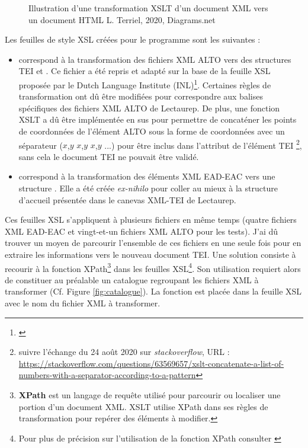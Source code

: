 \begin{figure}[h!]
    \centering
    \centerline{}
    \caption{Illustration d'une transformation XSLT d'un document XML vers un document HTML  \textcopyright L. Terriel, 2020, Diagrams.net}
    \label{fig:example_XSLT}
\end{figure}
\newpage
Les feuilles de style XSL créées pour le programme sont les suivantes : 
\begin{itemize}
    \item {} correspond à la transformation des fichiers XML ALTO vers des structures TEI  et . Ce fichier a été repris et adapté sur la base de la feuille XSL proposée par le Dutch Language Institute (INL)\footnote{\cite{dutch_language_institute_inl_alto2tei_nodate}}. Certaines règles de transformation ont dû être modifiées pour correspondre aux balises spécifiques des fichiers XML ALTO de Lectaurep. De plus, une fonction XSLT a dû être implémentée en sus pour permettre de concaténer les points de coordonnées de l'élément ALTO  sous la forme de coordonnées avec un séparateur ($x$,$y$ $x$,$y$ $x$,$y$ ...)  pour être inclus dans l'attribut  de l'élément TEI \footnote{suivre l'échange du 24 août 2020 sur \textit{stackoverflow}, URL : \url{https://stackoverflow.com/questions/63569657/xslt-concatenate-a-list-of-numbers-with-a-separator-according-to-a-pattern}}, sans cela le document TEI ne pouvait être validé.\\ 
    \item {} correspond à la transformation des éléments XML EAD-EAC vers une structure . Elle a été créée \textit{ex-nihilo} pour coller au mieux à la structure d'accueil présentée dans le canevas XML-TEI de Lectaurep.  
\end{itemize}
\bigskip
Ces feuilles XSL s'appliquent à plusieurs fichiers en même temps (quatre fichiers XML EAD-EAC et vingt-et-un fichiers XML ALTO pour les tests). J'ai dû trouver un moyen de parcourir l'ensemble de ces fichiers en une seule fois pour en extraire les informations vers le nouveau document TEI. Une solution consiste à recourir à la fonction XPath\footnote{\textbf{XPath} est un langage de requête utilisé pour parcourir ou localiser une portion d'un document XML. XSLT utilise XPath dans ses règles de transformation pour repérer des éléments à modifier.}  dans les feuilles XSL\footnote{Pour plus de précision sur l'utilisation de la fonction XPath  consulter \cite{holmes_xpath_2013}}. Son utilisation requiert alors de constituer au préalable un catalogue regroupant les fichiers XML à transformer (Cf. Figure \ref{fig:catalogue}). La fonction est placée dans la feuille XSL avec le nom du fichier XML  à transformer. 

